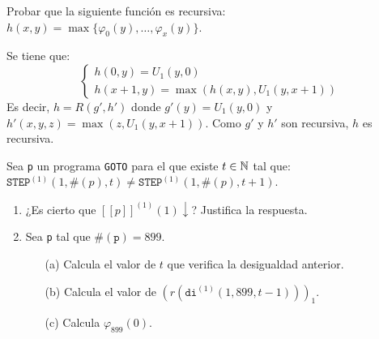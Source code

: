 \documentclass[twoside]{article}
\begin{document}
\newpage
\begin{ejercicio}{12}
Probar que la siguiente función es recursiva: $h(x,y) = \max\{φ_0(y),\dots,φ_x(y)\}$.
\end{ejercicio}
\begin{solucion}
Se tiene que:
\[ \begin{cases}
	h(0,y) = U_1(y,0)\\
	h(x+1,y) = \max(h(x,y),U_1(y,x+1))
\end{cases}\]
Es decir, $h = R(g',h')$ donde $g'(y) = U_1(y,0)$ y $h'(x,y,z)=\max(z,U_1(y,x+1))$. Como $g'$ y $h'$ son recursiva, $h$ es recursiva.
\end{solucion}

\newpage

\begin{ejercicio}{18}
Sea \texttt{p} un programa \texttt{GOTO} para el que existe $t \in \mathbb{N}$ tal que:
$\texttt{STEP}^{(1)}(1, \#(p), t) \neq \texttt{STEP}^{(1)}(1, \#(p), t + 1)$.
\begin{enumerate}
\item ¿Es cierto que $[\![p]\!]^{(1)}(1) \downarrow$? Justifica la respuesta.
\item Sea \texttt{p} tal que $\#(\texttt{p}) = 899$.
\begin{itemize}
\item[(a)] Calcula el valor de $t$ que verifica la desigualdad anterior.
\item[(b)] Calcula el valor de $(r(\texttt{di}^{(1)}(1, 899, t - 1)))_1$.
\item[(c)] Calcula $\varphi_{899}(0)$.
\end{itemize}
\end{enumerate}
\end{ejercicio}
\end{document}
